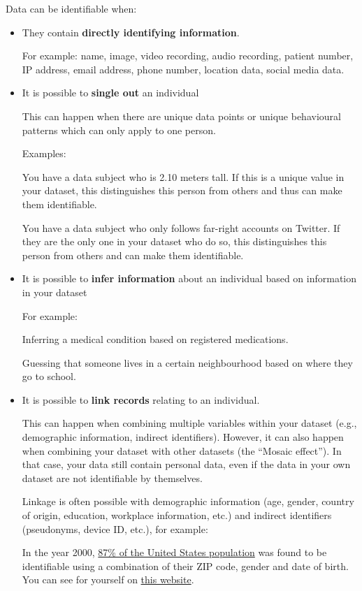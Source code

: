 \documentclass[
]{book}
\begin{document}
Data can be identifiable when:

\begin{itemize}
\item
  They contain \textbf{directly identifying information}.

  For example: name, image, video recording, audio recording, patient
  number, IP address, email address, phone number, location data, social media
  data.
\item
  It is possible to \textbf{single out} an individual

  This can happen when there are unique data points or unique behavioural
  patterns which can only apply to one person.

  Examples:

  You have a data subject who is 2.10 meters tall. If this is a unique
  value in your dataset, this distinguishes this person from others and thus
  can make them identifiable.

  You have a data subject who only follows far-right accounts on Twitter.
  If they are the only one in your dataset who do so, this distinguishes this
  person from others and can make them identifiable.
\item
  It is possible to \textbf{infer information} about an individual
  based on information in your dataset

  For example:

  Inferring a medical condition based on registered medications.

  Guessing that someone lives in a certain neighbourhood based on where they go to school.
\item
  It is possible to \textbf{link records} relating to an individual.

  This can happen when combining multiple variables within your dataset (e.g., demographic
  information, indirect identifiers). However, it can also happen when combining
  your dataset with other datasets (the ``Mosaic effect''). In that case, your data
  still contain personal data, even if the data in your own dataset are not
  identifiable by themselves.

  Linkage is often possible with demographic information (age,
  gender, country of origin, education, workplace information, etc.) and
  indirect identifiers (pseudonyms, device ID, etc.), for example:

  In the year 2000,
  \href{https://dataprivacylab.org/projects/identifiability/paper1.pdf}{87\% of the United States population}
  was found to be identifiable using a combination of their ZIP code, gender
  and date of birth. You can see for yourself on
  \href{https://cpg.doc.ic.ac.uk/individual-risk/}{this website}.


\end{itemize}
\end{document}
